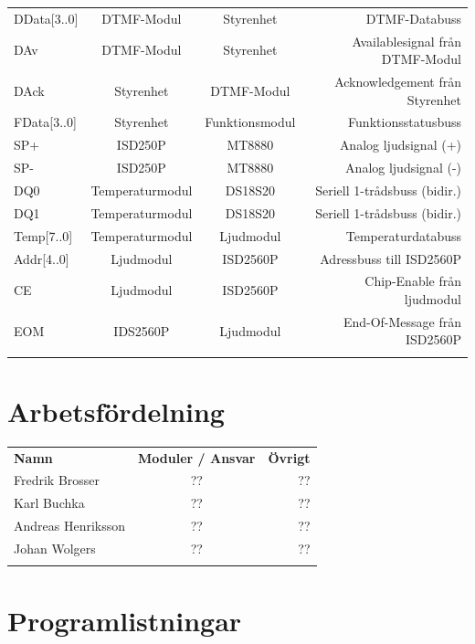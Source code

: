 \documentclass[a4paper,11pt]{article}
\begin{document}
\begin{tabular}{l c c r}
		DData[3..0] & DTMF-Modul & Styrenhet & DTMF-Databuss\\
		DAv & DTMF-Modul & Styrenhet & Availablesignal från DTMF-Modul\\
		DAck & Styrenhet & DTMF-Modul & Acknowledgement från Styrenhet\\

		FData[3..0] & Styrenhet & Funktionsmodul & Funktionsstatusbuss\\

		SP+ & ISD250P & MT8880 & Analog ljudsignal (+)\\
		SP- & ISD250P & MT8880 & Analog ljudsignal (-)\\

		DQ0 & Temperaturmodul & DS18S20 & Seriell 1-trådsbuss (bidir.)\\
		DQ1 & Temperaturmodul & DS18S20 & Seriell 1-trådsbuss (bidir.)\\

		Temp[7..0] & Temperaturmodul & Ljudmodul & Temperaturdatabuss\\

		Addr[4..0] & Ljudmodul & ISD2560P & Adressbuss till ISD2560P\\
		CE & Ljudmodul & ISD2560P & Chip-Enable från ljudmodul\\
		EOM & IDS2560P & Ljudmodul & End-Of-Message från ISD2560P\\\\
	\end{tabular}

	\section{Arbetsfördelning}

	\begin{tabular}{l c r}
		\\{\bf Namn} & {\bf Moduler / Ansvar} & {\bf Övrigt}\\
		Fredrik Brosser 	& ?? 	& ??\\
		Karl Buchka 		& ?? 	& ??\\
		Andreas Henriksson 	& ?? 	& ??\\
		Johan Wolgers 		& ??	& ??\\\\
	\end{tabular}

	\section{Programlistningar}
	
\end{document}
